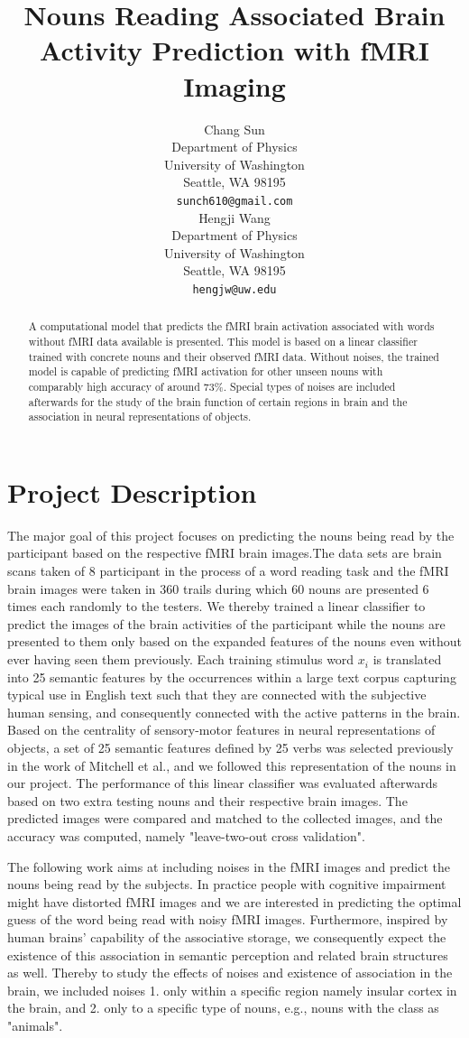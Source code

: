 \documentclass{article}
\title{Nouns Reading Associated Brain Activity Prediction with fMRI Imaging}
\author{
  Chang Sun\\
  Department of Physics\\
  University of Washington\\
  Seattle, WA 98195\\
   \texttt{sunch610@gmail.com} \\
   \And 
   Hengji Wang\\
  Department of Physics\\
  University of Washington\\
  Seattle, WA 98195 \\
  \texttt{hengjw@uw.edu} \\
}
\begin{document}
\maketitle

\begin{abstract}
A computational model that predicts the fMRI brain activation associated with words without fMRI data available is presented. This model is based on a linear classifier trained with concrete nouns and their observed fMRI data. Without noises, the trained model is capable of predicting fMRI activation for other unseen nouns with comparably high accuracy of around $73\%$. Special types of noises are included afterwards for the study of the brain function of certain regions in brain and the association in neural representations of objects.
\end{abstract}

\section{Project Description}
The major goal of this project focuses on predicting the nouns being read by the participant based on the respective fMRI brain images.The data sets are brain scans taken of 8 participant in the process of a word reading task and the fMRI brain images were taken in 360 trails during which 60 nouns are presented 6 times each randomly to the testers. We thereby trained a linear classifier to predict the images of the brain activities of the participant while the nouns are presented to them only based on the expanded features of the nouns even without ever having seen them previously. Each training stimulus word $x_{i}$ is translated into 25 semantic features by the occurrences within a large text corpus capturing typical use in English text such that they are connected with the subjective human sensing, and consequently connected with the active patterns in the brain. Based on the centrality of sensory-motor features in neural representations of objects, a set of 25 semantic features defined by 25 verbs was selected previously in the work of Mitchell et al., and we followed this representation of the nouns in our project. The performance of this linear classifier was evaluated afterwards based on two extra testing nouns and their respective brain images. The predicted images were compared and matched to the collected images, and the accuracy was computed, namely "leave-two-out cross validation".

The following work aims at including noises in the fMRI images and predict the nouns being read by the subjects. In practice people with cognitive impairment might have distorted fMRI images and we are interested in predicting the optimal guess of the word being read with noisy fMRI images. Furthermore, inspired by human brains' capability of the associative storage, we consequently expect the existence of this association in semantic perception and related brain structures as well. Thereby to study the effects of noises and existence of association in the brain, we included noises 1. only within a specific region namely insular cortex in the brain, and 2. only to a specific type of nouns, e.g., nouns with the class as "animals".
\end{document}
